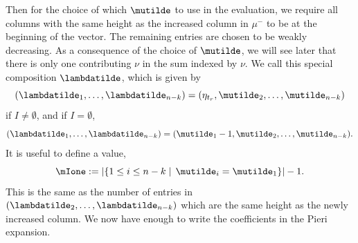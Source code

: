 Then for the choice of which $\mutilde$ to use in the evaluation, we require all columns with the same height as the increased column in $\mu^-$ to be at the beginning of the vector. The remaining entries are chosen to be weakly decreasing. As a consequence of the choice of $\mutilde$, we will see later that there is only one contributing $\nu$ in the sum indexed by $\nu$. We call this special composition $\lambdatilde$, which is given by
\[(\lambdatilde_1,  \dotsc, \lambdatilde_{n-k}) = (\eta_{t_r}, \mutilde_2, \dotsc, \mutilde_{n-k}) \]
if $I\neq \emptyset$, and if $I = \emptyset$,
\[ (\lambdatilde_1, \dotsc, \lambdatilde_{n-k}) = (\mutilde_1-1, \mutilde_2, \dotsc, \mutilde_{n-k}).\]
It is useful to define a value,
 \[\mIone := |\{ 1\leq i \leq n-k \mid \, \mutilde_i = \mutilde_1  \}|-1. \]
This is the same as the number of entries in $(\lambdatilde_2,\dotsc, \lambdatilde_{n-k})$ which are the same height as the newly increased column. We now have enough to write the coefficients in the Pieri expansion.

